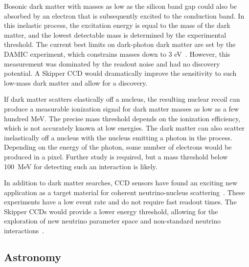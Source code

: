 \documentclass[aps,prl,reprint,superscriptaddress,floatfix,nofootinbib,showkeys,showpacs,preprintnumbers]{revtex4-1}
\begin{document}
Bosonic dark matter with masses as low as the silicon band gap could also be absorbed by an electron that is subsequently excited to the conduction band. 
In this inelastic process, the excitation energy is equal to the mass of the 
dark matter, and the lowest detectable mass is determined by the experimental threshold. The current best limits on dark-photon dark matter are set by the DAMIC experiment, which constrains masses down to 3 eV~\cite{Aguilar-Arevalo:2016zop}. However, this 
measurement was dominated by the readout noise and had no discovery potential.  
A Skipper CCD would dramatically improve the sensitivity to such 
low-mass dark matter and allow for a discovery.  

If dark matter scatters elastically off a nucleus, the resulting nuclear recoil can 
produce a measurable ionization signal for dark matter masses as low as a few hundred MeV. 
The precise mass threshold depends on the ionization efficiency, which is not accurately known at low energies.  The dark matter can also scatter inelastically off 
a nucleus with the nucleus emitting a photon in the process.  Depending on the 
energy of the photon, some number of electrons would be produced in a pixel. 
Further study is required, but a mass threshold below 100~MeV for detecting such an 
interaction is likely. 

In addition to dark matter searches, CCD sensors have found an exciting new application as a target material for coherent neutrino-nucleus scattering~\cite{Moroni:2014wia, DAMIC:2013,Aguilar-Arevalo:2016qen}. These experiments have a low event rate and do not require fast readout times.  The Skipper CCDs would provide a lower energy threshold, allowing for the exploration of new neutrino parameter space and non-standard neutrino interactions~\cite{Harnik:2012ni}.

\subsection{Astronomy}
\end{document}

